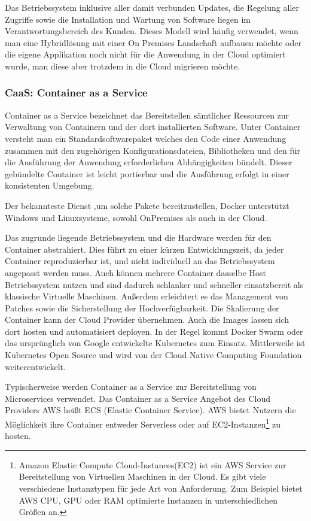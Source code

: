    Das Betriebssystem inklusive aller damit verbunden Updates, die Regelung aller Zugriffe sowie die Installation und Wartung von Software liegen im Verantwortungsbereich des Kunden.
   Dieses Modell wird häufig verwendet, wenn man eine Hybridlösung mit einer On Premises Landschaft aufbauen möchte oder die eigene Applikation noch nicht für die Anwendung in der Cloud optimiert wurde, man diese aber trotzdem in die Cloud migrieren möchte.\cite[]{CloudComputingDef}

   \subsubsection{CaaS: Container as a Service}
   Container as a Service bezeichnet das Bereitstellen sämtlicher Ressourcen zur Verwaltung von Containern und der dort installierten Software.
   Unter Container versteht man ein {}\glqq Standardsoftwarepaket\grqq{} welches {}\glqq den Code einer Anwendung zusammen mit den zugehörigen Konfigurationsdateien,
   Bibliotheken und den für die Ausführung der Anwendung erforderlichen Abhängigkeiten\grqq{} bündelt. \cite[]{CaaS}
   Dieser gebündelte Container ist leicht portierbar und die Ausführung erfolgt in einer konsistenten Umgebung.

   Der bekannteste Dienst ,um solche Pakete bereitzustellen, Docker unterstützt Windows und Linuxsysteme, sowohl OnPremises als auch in der Cloud.

   Das zugrunde liegende Betriebssystem und die Hardware werden für den Container abstrahiert.
   Dies führt zu einer kürzen Entwicklungszeit, da jeder Container reproduzierbar ist, und nicht individuell an das Betriebssystem angepasst werden muss.
   Auch können mehrere Container dasselbe Host Betriebssystem nutzen und sind dadurch schlanker und schneller einsatzbereit als klassische Virtuelle Maschinen.
   Außerdem erleichtert es das Management von Patches sowie die Sicherstellung der Hochverfügbarkeit.
   Die Skalierung der Container kann der Cloud Provider übernehmen. Auch die Images lassen sich dort hosten und automatisiert deployen.
   In der Regel kommt Docker Swarm oder das ursprünglich von Google entwickelte Kubernetes zum Einsatz.
   Mittlerweile ist Kubernetes Open Source und wird von der Cloud Native Computing Foundation weiterentwickelt.

   Typischerweise werden Container as a Service zur Bereitstellung von Microservices verwendet.
   Das Container as a Service Angebot des Cloud Providers AWS heißt ECS (Elastic Container Service).
   AWS bietet Nutzern die Möglichkeit ihre Container entweder Serverless oder auf EC2-Instanzen\footnote{Amazon Elastic Compute Cloud-Instances(EC2) ist ein AWS Service
   zur Bereitstellung von Virtuellen Maschinen in der Cloud. Es gibt viele verschiedene Instanztypen für jede Art von Anforderung.
   Zum Beispiel bietet AWS CPU, GPU oder RAM optimierte Instanzen in unterschiedlichen Größen an. } zu hosten. \cite[]{AWSECS}

